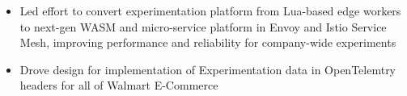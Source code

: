 \documentclass[10pt,a4paper,ragged2e,withhyper]{altacv}
\begin{document}
\begin{paracol}{2}
  \divider
  
  \begin{itemize}
    \item Led effort to convert experimentation platform from Lua-based edge workers to next-gen WASM and micro-service platform in Envoy and Istio Service Mesh, improving performance and reliability for company-wide experiments
    \item Drove design for implementation of Experimentation data in OpenTelemtry headers for all of Walmart E-Commerce
  \end{itemize}
  
  
  

\end{paracol}
\end{document}
